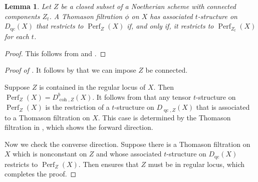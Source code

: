 \documentclass[11pt]{amsart}
\theoremstyle{plain}
\newtheorem{lemma}[theorem]{Lemma}
\theoremstyle{definition}
\numberwithin{equation}{section}
\numberwithin{theorem}{section}
\begin{document}
\begin{lemma}\label{lem:restriction_iff_to_connected_components}
    Let $Z$ be a closed subset of a Noetherian scheme with connected components $Z_t$. A Thomason filtration $\phi$ on $X$ has associated $t$-structure on $D_{\operatorname{qc}}(X)$ that restricts to $\operatorname{Perf}_Z (X)$ if, and only if, it restricts to $\operatorname{Perf}_{Z_t} (X)$ for each $t$.
\end{lemma}

\begin{proof}
    This follows from  and .
\end{proof}

\begin{proof}
    [Proof of ]
    It follows by  that we can impose $Z$ be connected. 

    Suppose $Z$ is contained in the regular locus of $X$. Then $\operatorname{Perf}_Z (X) = D^b_{\operatorname{coh},Z}(X)$. It follows from  that any tensor $t$-structure on $\operatorname{Perf}_Z (X)$ is the restriction of a $t$-structure on $D_{\operatorname{qc},Z}(X)$ that is associated to a Thomason filtration on $X$. This case is determined by the Thomason filtration in , which shows the forward direction.

    Now we check the converse direction. Suppose there is a Thomason filtration on $X$ which is nonconstant on $Z$ and whose associated $t$-structure on $D_{\operatorname{qc}}(X)$ restricts to $\operatorname{Perf}_Z (X)$. Then  ensures that $Z$ must be in regular locus, which completes the proof.
\end{proof}
\end{document}
